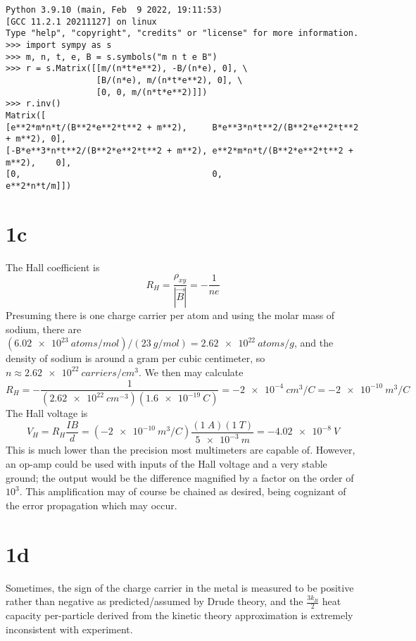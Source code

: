 \documentclass{article}
\begin{document}
\begin{verbatim}
Python 3.9.10 (main, Feb  9 2022, 19:11:53)
[GCC 11.2.1 20211127] on linux
Type "help", "copyright", "credits" or "license" for more information.
>>> import sympy as s
>>> m, n, t, e, B = s.symbols("m n t e B")
>>> r = s.Matrix([[m/(n*t*e**2), -B/(n*e), 0], \
                  [B/(n*e), m/(n*t*e**2), 0], \
                  [0, 0, m/(n*t*e**2)]])
>>> r.inv()
Matrix([
[e**2*m*n*t/(B**2*e**2*t**2 + m**2),     B*e**3*n*t**2/(B**2*e**2*t**2 + m**2), 0],
[-B*e**3*n*t**2/(B**2*e**2*t**2 + m**2), e**2*m*n*t/(B**2*e**2*t**2 + m**2),    0],
[0,                                      0,                            e**2*n*t/m]])
\end{verbatim}

\section*{1c}
The Hall coefficient is
\[R_{H}=\frac{\rho_{xy}}{|\vec{B}|}=-\frac{1}{ne}\]
Presuming there is one charge carrier per atom and using the molar mass of sodium, there are $(\SI{6.02e23}{atoms/mol})/(\SI{23}{g/mol})=\SI{2.62e22}{atoms/g}$, and the density of sodium is around a gram per cubic centimeter, so  $n\approx \SI{2.62e22}{carriers/cm^{3}}$. We then may calculate
\[R_{H}=-\frac{1}{(\SI{2.62e22}{cm^{-3}})(\SI{1.6e-19}{C})}=\SI{-2e-4}{cm^{3}/C}=\SI{-2e-10}{m^{3}/C}\]
The Hall voltage is
\[V_{H}=R_{H}\frac{IB}{d}=(\SI{-2e-10}{m^{3}/C})\frac{(\SI{1}{A})(\SI{1}{T})}{\SI{5e-3}{m}}=\SI{-4.02e-8}{V}\]
This is much lower than the precision most multimeters are capable of. However, an op-amp could be used with inputs of the Hall voltage and a very stable ground; the output would be the difference magnified by a factor on the order of $10^{3}$. This amplification may of course be chained as desired, being cognizant of the error propagation which may occur.

\section*{1d}
Sometimes, the sign of the charge carrier in the metal is measured to be positive rather than negative as predicted/assumed by Drude theory, and the $\frac{3k_{B}}{2}$ heat capacity per-particle derived from the kinetic theory approximation is extremely inconsistent with experiment.
\end{document}
